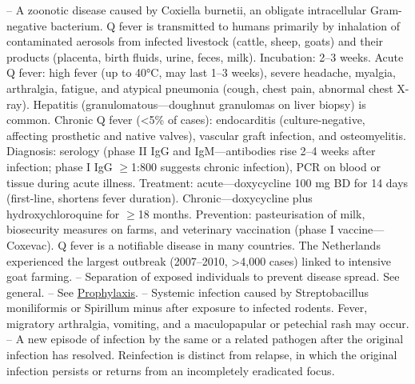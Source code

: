 -- A zoonotic disease caused by Coxiella burnetii, an obligate intracellular Gram-negative bacterium. Q fever is transmitted to humans primarily by inhalation of contaminated aerosols from infected livestock (cattle, sheep, goats) and their products (placenta, birth fluids, urine, feces, milk). Incubation: 2--3 weeks. Acute Q fever: high fever (up to 40°C, may last 1--3 weeks), severe headache, myalgia, arthralgia, fatigue, and atypical pneumonia (cough, chest pain, abnormal chest X-ray). Hepatitis (granulomatous—doughnut granulomas on liver biopsy) is common. Chronic Q fever (<5\% of cases): endocarditis (culture-negative, affecting prosthetic and native valves), vascular graft infection, and osteomyelitis. Diagnosis: serology (phase II IgG and IgM—antibodies rise 2--4 weeks after infection; phase I IgG \(\ge\)1:800 suggests chronic infection), PCR on blood or tissue during acute illness. Treatment: acute—doxycycline 100 mg BD for 14 days (first-line, shortens fever duration). Chronic—doxycycline plus hydroxychloroquine for \(\ge\)18 months. Prevention: pasteurisation of milk, biosecurity measures on farms, and veterinary vaccination (phase I vaccine—Coxevac). Q fever is a notifiable disease in many countries. The Netherlands experienced the largest outbreak (2007--2010, >4,000 cases) linked to intensive goat farming.
-- Separation of exposed individuals to prevent disease spread. See general.
-- See \hyperlink{Prophylaxis}{Prophylaxis}.
-- Systemic infection caused by Streptobacillus moniliformis or Spirillum minus after exposure to infected rodents. Fever, migratory arthralgia, vomiting, and a maculopapular or petechial rash may occur.
-- A new episode of infection by the same or a related pathogen after the original infection has resolved. Reinfection is distinct from relapse, in which the original infection persists or returns from an incompletely eradicated focus.
